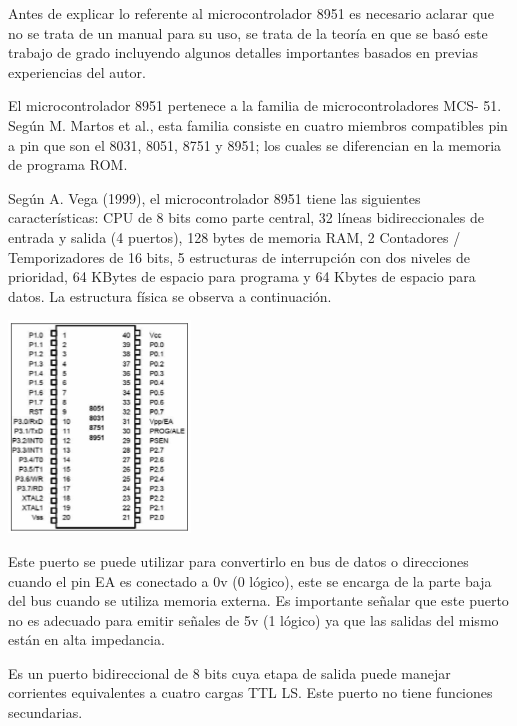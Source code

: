	Antes de explicar lo referente al microcontrolador 8951 es necesario aclarar 
	que no se trata de un manual para su uso, se trata de la teoría en que se basó este 
	trabajo de grado incluyendo algunos detalles importantes basados en previas 
	experiencias del autor. 
	
	 El microcontrolador 8951 pertenece a la familia de microcontroladores MCS- 
	51. Según M. Martos et al., esta familia consiste en cuatro miembros compatibles pin 
	a pin que son el 8031, 8051, 8751 y 8951; los cuales se diferencian en la memoria de 
	programa ROM. 
	
	 Según A. Vega (1999), el microcontrolador 8951 tiene las siguientes 
	características: CPU de 8 bits como parte central, 32 líneas bidireccionales de entrada 
	y salida (4 puertos), 128 bytes de memoria RAM, 2 Contadores / Temporizadores de 
	16 bits, 5 estructuras de interrupción con dos niveles de prioridad, 64 KBytes de 
	espacio para programa y 64 Kbytes de espacio para datos. La estructura física se 
	observa a continuación. 
	
	\begin{ilustracion}
		\includegraphics{figures/figura-6.png}
	\end{ilustracion}
	
	 Este puerto se puede utilizar para convertirlo en bus de datos o direcciones 
	cuando el pin EA es conectado a 0v (0 lógico), este se encarga de la parte baja del bus 
	cuando se utiliza memoria externa. Es importante señalar que este puerto no es 
	adecuado para emitir señales de 5v (1 lógico) ya que las salidas del mismo están en 
	alta impedancia. 
	
	 Es un puerto bidireccional de 8 bits cuya etapa de salida puede manejar 
	corrientes equivalentes a cuatro cargas TTL LS. Este puerto no tiene funciones 
	secundarias. 
	

